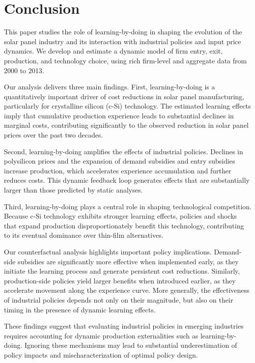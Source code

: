 \documentclass[12pt]{article}
\begin{document}
\section{Conclusion}\label{sec:LBDconclusion}
This paper studies the role of learning-by-doing in shaping the evolution of the solar panel industry and its interaction with industrial policies and input price dynamics. We develop and estimate a dynamic model of firm entry, exit, production, and technology choice, using rich firm-level and aggregate data from 2000 to 2013.

Our analysis delivers three main findings.
First, learning-by-doing is a quantitatively important driver of cost reductions in solar panel manufacturing, particularly for crystalline silicon (c-Si) technology. The estimated learning effects imply that cumulative production experience leads to substantial declines in marginal costs, contributing significantly to the observed reduction in solar panel prices over the past two decades.

Second, learning-by-doing amplifies the effects of industrial policies. Declines in polysilicon prices and the expansion of demand subsidies and entry subsidies increase production, which accelerates experience accumulation and further reduces costs. This dynamic feedback loop generates effects that are substantially larger than those predicted by static analyses.

Third, learning-by-doing plays a central role in shaping technological competition. Because c-Si technology exhibits stronger learning effects, policies and shocks that expand production disproportionately benefit this technology, contributing to its eventual dominance over thin-film alternatives.

Our counterfactual analysis highlights important policy implications. Demand-side subsidies are significantly more effective when implemented early, as they initiate the learning process and generate persistent cost reductions. Similarly, production-side policies yield larger benefits when introduced earlier, as they accelerate movement along the experience curve. More generally, the effectiveness of industrial policies depends not only on their magnitude, but also on their timing in the presence of dynamic learning effects.

These findings suggest that evaluating industrial policies in emerging industries requires accounting for dynamic production externalities such as learning-by-doing. Ignoring these mechanisms may lead to substantial underestimation of policy impacts and mischaracterization of optimal policy design.
\end{document}
